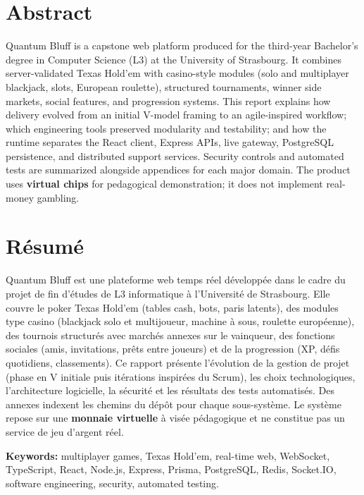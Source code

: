 \documentclass[11pt,a4paper]{article}
\begin{document}
\section*{Abstract}

\noindent
Quantum Bluff is a capstone web platform produced for the third-year Bachelor's degree in Computer Science (L3) at the University of Strasbourg. It combines server-validated Texas Hold'em with casino-style modules (solo and multiplayer blackjack, slots, European roulette), structured tournaments, winner side markets, social features, and progression systems. This report explains how delivery evolved from an initial V-model framing to an agile-inspired workflow; which engineering tools preserved modularity and testability; and how the runtime separates the React client, Express APIs, live gateway, PostgreSQL persistence, and distributed support services. Security controls and automated tests are summarized alongside appendices for each major domain. The product uses \textbf{virtual chips} for pedagogical demonstration; it does not implement real-money gambling.

\medskip
{}
\section*{Résumé}

\noindent
Quantum Bluff est une plateforme web temps réel développée dans le cadre du projet de fin d'études de L3 informatique à l'Université de Strasbourg. Elle couvre le poker Texas Hold'em (tables cash, bots, paris latents), des modules type casino (blackjack solo et multijoueur, machine à sous, roulette européenne), des tournois structurés avec marchés annexes sur le vainqueur, des fonctions sociales (amis, invitations, prêts entre joueurs) et de la progression (XP, défis quotidiens, classements). Ce rapport présente l'évolution de la gestion de projet (phase en V initiale puis itérations inspirées du Scrum), les choix technologiques, l'architecture logicielle, la sécurité et les résultats des tests automatisés. Des annexes indexent les chemins du dépôt pour chaque sous-système. Le système repose sur une \textbf{monnaie virtuelle} à visée pédagogique et ne constitue pas un service de jeu d'argent réel.

\medskip
\noindent\textbf{Keywords:} multiplayer games, Texas Hold'em, real-time web, WebSocket, TypeScript, React, Node.js, Express, Prisma, PostgreSQL, Redis, Socket.IO, software engineering, security, automated testing.
\end{document}
